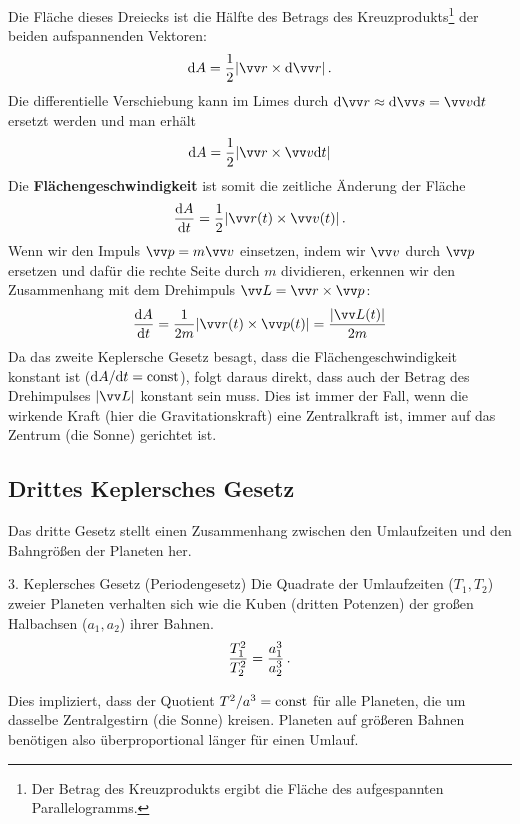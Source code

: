 Die Fläche dieses Dreiecks ist die Hälfte des Betrags des Kreuzprodukts\footnote{Der Betrag des Kreuzprodukts ergibt die Fläche des aufgespannten Parallelogramms.} der beiden aufspannenden Vektoren:
\begin{equation}\label{eq: dA_element}
    \dd A = \frac{1}{2} |\ivec{r} \times \dd\ivec{r}|  \mDot
\end{equation}
Die differentielle Verschiebung kann im Limes durch $\dd \ivec{r} \approx \dd \ivec{s} = \ivec{v} \dd t$ ersetzt werden und man erhält
\begin{equation}
    \dd A = \frac{1}{2} |\ivec{r} \times \ivec{v} \dd t|
\end{equation}
Die \textbf{Flächengeschwindigkeit} ist somit die zeitliche Änderung der Fläche
\begin{equation}\label{eq: flaechengeschwindigkeit}
    \frac{\dd A}{\dd t} = \frac{1}{2} |\ivec{r}(t) \times \ivec{v}(t)| \mDot
\end{equation}
Wenn wir den Impuls $\ivec{p} = m\ivec{v}$ einsetzen, indem wir $\ivec{v}$ durch $\ivec{p}$ ersetzen und dafür die rechte Seite durch $m$ dividieren, erkennen wir den Zusammenhang mit dem Drehimpuls $\ivec{L} = \ivec{r} \times \ivec{p}$:
\begin{equation}\label{eq: flaechengeschwindigkeit_drehimpuls}
    \frac{\dd A}{\dd t} = \frac{1}{2m} |\ivec{r}(t) \times \ivec{p}(t)| = \frac{|\ivec{L}(t)|}{2m}
\end{equation}
Da das zweite Keplersche Gesetz besagt, dass die Flächengeschwindigkeit konstant ist ($\mathrm{d} A/\mathrm{d} t = \mathrm{const}$), folgt daraus direkt, dass auch der Betrag des Drehimpulses $|\ivec{L}|$ konstant sein muss. Dies ist immer der Fall, wenn die wirkende Kraft (hier die Gravitationskraft) eine Zentralkraft ist, \gDh immer auf das Zentrum (die Sonne) gerichtet ist.




\subsection{Drittes Keplersches Gesetz}\label{subsec: kepler3}
Das dritte Gesetz stellt einen Zusammenhang zwischen den Umlaufzeiten und den Bahngrößen der Planeten her.

\begin{rememberbox}{3. Keplersches Gesetz (Periodengesetz)}
Die Quadrate der Umlaufzeiten ($T_1, T_2$) zweier Planeten verhalten sich wie die Kuben (dritten Potenzen) der großen Halbachsen ($a_1, a_2$) ihrer Bahnen. 
\begin{equation}\label{eq: kepler3}
    \frac{T_1^2}{T_2^2} = \frac{a_1^3}{a_2^3} \,.
\end{equation}
\end{rememberbox}
Dies impliziert, dass der Quotient $T^2/a^3 = \mathrm{const}$ für alle Planeten, die um dasselbe Zentralgestirn (die Sonne) kreisen. Planeten auf größeren Bahnen benötigen also überproportional länger für einen Umlauf.

